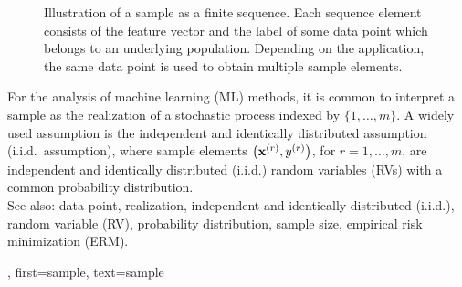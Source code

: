 {{{\begin{figure}
\begin{center}
 		\end{center}
 		\caption{Illustration of a sample as a finite sequence. Each sequence element consists 
 			of the feature vector and the label of some data point which belongs to 
 			an underlying population. Depending on the application, the same data point 
 			is used to obtain multiple sample elements. 
 			\label{fig:sample-sequence_dict}}
 	\end{figure} 	
 	For the analysis of machine learning (ML) methods, it is common to interpret a sample as the realization 
 	of a stochastic process indexed by $\{1,\ldots,m\}$. A widely used assumption is the independent and identically distributed assumption (i.i.d.\ assumption), 
 	where sample elements $\left( {\bf x}^{(r)},y^{(r)} \right)$, for $r=1,\ldots,m$, 
 	are independent and identically distributed (i.i.d.) random variables (RVs) with a common probability distribution.  \\
 See also: data point, realization, independent and identically distributed (i.i.d.), random variable (RV), probability distribution, sample size, empirical risk minimization (ERM).},
 first={sample},
 text={sample}
}



}
